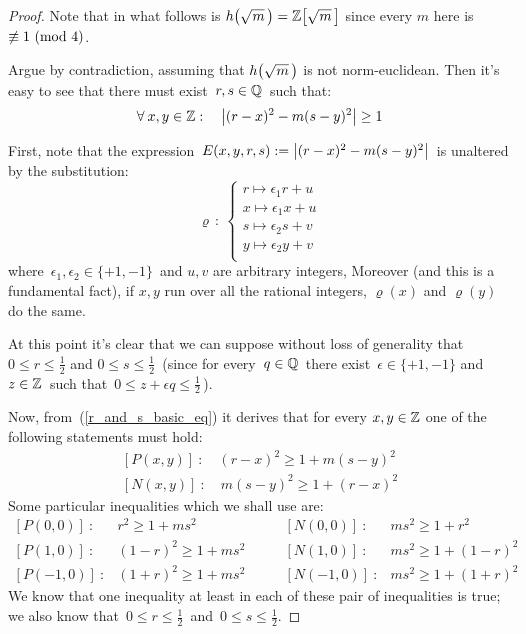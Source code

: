 \begin{proof}
%
Note that in what follows is $\hh{m} = \ZZ{m}$ since every $m$ here
is $\not\congruent 1\ (\mathrm{mod}\ 4)$.

Argue by contradiction, assuming that $\hh{m}$ is not norm-euclidean.
Then it's easy to see that there must exist\, $r, s \in \mathbb{Q}$\, such that:
\begin{equation}\label{r_and_s_basic_eq}
\forall\: x,y \in \mathbb{Z}: \quad
\left| (r - x)^2 - m(s - y)^2 \right| \geq 1
\end{equation}

First, note that the expression\,
$E(x, y, r, s):= \left| (r - x)^2 - m (s - y)^2 \right|$\,
is unaltered by the substitution:
%
\begin{equation}
\varrho\,:\:\left\{ \begin{array}{l}
r \mapsto \epsilon_1 r + u \\[4pt]
x \mapsto \epsilon_1 x + u \\[4pt]
s \mapsto \epsilon_2 s + v \\[4pt]
y \mapsto \epsilon_2 y + v \\[4pt]
\end{array}
\right.
\end{equation}
%
where\, $\epsilon_1, \epsilon_2 \in \{+1, -1\}$\, and
$u,v$ are arbitrary integers,
Moreover (and this is a fundamental fact), if $x,y$ run
over all the rational integers, $\varrho(x)$ and $\varrho(y)$
do the same.

At this point it's clear that we can suppose without loss of
generality that \,$0 \leq r \leq \frac{1}{2}$ and
$0 \leq s \leq \frac{1}{2}$\, (since for every\, $q \in \mathbb{Q}$\,
there exist\, $\epsilon \in \{+1, -1\}$ and $z \in \mathbb{Z}$\, such
that\, $0 \leq z + \epsilon q \leq \frac{1}{2}$\,).

Now, from~(\ref{r_and_s_basic_eq}) it derives that
for every $x, y \in \mathbb{Z}$ one of the following
statements must hold:
%
\begin{eqnarray}
\left[P(x,y)\right]\::\quad (r - x)^2 \geq 1 + m(s - y)^2
\\[4pt]
\left[N(x,y)\right]\::\quad m(s - y)^2 \geq 1 + (r - x)^2
\end{eqnarray}
%
Some particular inequalities which we shall use are:
\begin{equation*}
\begin{array}{llll}
\left[P(0,0)\right]\:: & r^2 \geq 1 + ms^2 &
\quad\quad
\left[N(0,0)\right]\:: & ms^2 \geq 1 + r^2
\\[7pt]
\left[P(1,0)\right]\:: & (1 - r)^2 \geq 1 + ms^2 &
\quad\quad
\left[N(1,0)\right]\:: & ms^2 \geq 1 + (1 - r)^2
\\[7pt]
\left[P(-1,0)\right]\:: & (1 + r)^2 \geq 1 + ms^2 &
\quad\quad
\left[N(-1,0)\right]\:: & ms^2 \geq 1 + (1 + r)^2
\end{array}
\end{equation*}
%
We know that one inequality at least in each of these
pair of inequalities is true; we also know that\,
$0 \leq r \leq \frac{1}{2}$\, and\,
$0 \leq s \leq \frac{1}{2}$.


\end{proof}

